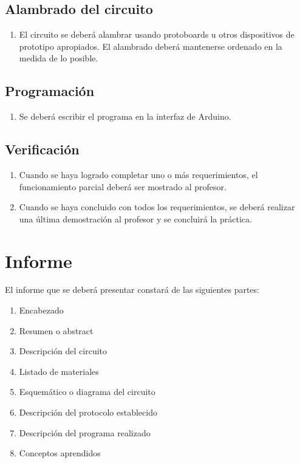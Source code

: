\documentclass[12pt,letterpaper]{IEEEtran}
\begin{document}
\subsection{Alambrado del circuito}

\begin{enumerate}[resume]
	\item El circuito se deberá alambrar usando protoboards u otros dispositivos de prototipo apropiados. El alambrado deberá mantenerse ordenado en la medida de lo posible.
\end{enumerate}

\subsection{Programación}

\begin{enumerate}[resume]
	\item Se deberá escribir el programa en la interfaz de Arduino.
\end{enumerate}

\subsection{Verificación}

\begin{enumerate}[resume]
	\item Cuando se haya logrado completar uno o más requerimientos, el funcionamiento parcial deberá ser mostrado al profesor.
	\item Cuando se haya concluido con todos los requerimientos, se deberá realizar una última demostración al profesor y se concluirá la práctica.
\end{enumerate}

\section{Informe}

El informe que se deberá presentar constará de las siguientes partes:

\begin{enumerate}
  \item Encabezado
  \item Resumen o abstract
  \item Descripción del circuito
  \item Listado de materiales
  \item Esquemático o diagrama del circuito
  \item Descripción del protocolo establecido
  \item Descripción del programa realizado
  \item Conceptos aprendidos
\end{enumerate}
\end{document}
